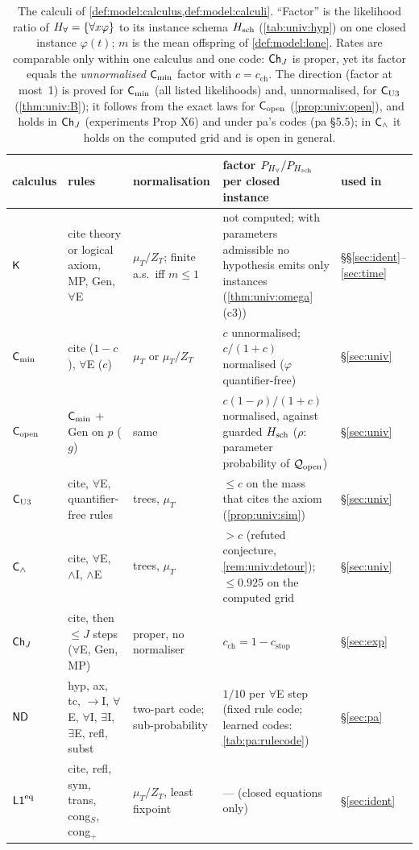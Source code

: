 \begin{table}[ht]
\crefabbrev
\centering\footnotesize
\begin{tabularx}{\textwidth}{@{}l>{\raggedright\arraybackslash}p{3.3cm}>{\raggedright\arraybackslash}p{2.4cm}>{\raggedright\arraybackslash}X>{\raggedright\arraybackslash}p{1.3cm}@{}}
\toprule
calculus & rules & normalisation & factor $P_{H_{\forall}}/P_{H_{\mathrm{sch}}}$ per closed instance & used in\\
\midrule
$\mathsf{K}$ & cite theory or logical axiom, MP, Gen, $\forall$E & $\mu_T/Z_T$; finite a.s.\ iff $m\le1$ & not computed; with parameters admissible no hypothesis emits only instances (\cref{thm:univ:omega}(c3)) & \S\S\ref{sec:ident}--\ref{sec:time}\\
$\mathsf{C}_{\min}$ & cite ($1-c$), $\forall$E ($c$) & $\mu_T$ or $\mu_T/Z_T$ & $c$ unnormalised; $c/(1+c)$ normalised ($\varphi$ quantifier-free) & \S\ref{sec:univ}\\
$\mathsf{C}_{\mathrm{open}}$ & $\mathsf{C}_{\min}$ + Gen on $p$ ($g$) & same & $c(1-\rho)/(1+c)$ normalised, against guarded $H_{\mathrm{sch}}$ ($\rho$: parameter probability of $\mathcal{Q}_{\mathrm{open}}$) & \S\ref{sec:univ}\\
$\mathsf{C}_{\mathrm{U3}}$ & cite, $\forall$E, quantifier-free rules & trees, $\mu_T$ & $\le c$ on the mass that cites the axiom (\cref{prop:univ:sim}) & \S\ref{sec:univ}\\
$\mathsf{C}_{\wedge}$ & cite, $\forall$E, $\wedge$I, $\wedge$E & trees, $\mu_T$ & $>c$ (refuted conjecture, \cref{rem:univ:detour}); $\le0.925$ on the computed grid & \S\ref{sec:univ}\\
$\mathsf{Ch}_{J}$ & cite, then $\le J$ steps ($\forall$E, Gen, MP) & proper, no normaliser & $c_{\mathrm{ch}}=1-c_{\mathrm{stop}}$ & \S\ref{sec:exp}\\
$\mathsf{ND}$ & hyp, ax, tc, $\to$I, $\forall$E, $\forall$I, $\exists$I, $\exists$E, refl, subst & two-part code; sub-probability & $1/10$ per $\forall$E step (fixed rule code; learned codes: \cref{tab:pa:rulecode}) & \S\ref{sec:pa}\\
$\mathord{\mathsf{L1}}^{\mathrm{eq}}$ & cite, refl, sym, trans, cong$_S$, cong$_+$ & $\mu_T/Z_T$, least fixpoint & --- (closed equations only) & \S\ref{sec:ident}\\
\bottomrule
\end{tabularx}
\caption{The calculi of \cref{def:model:calculus,def:model:calculi}. ``Factor'' is the likelihood ratio of $H_{\forall}=\{\forall x\varphi\}$ to its instance schema $H_{\mathrm{sch}}$ (\cref{tab:univ:hyp}) on one closed instance $\varphi(t)$; $m$ is the mean offspring of \cref{def:model:lone}. Rates are comparable only within one calculus and one code: $\mathsf{Ch}_{J}$ is proper, yet its factor equals the \emph{unnormalised} $\mathsf{C}_{\min}$ factor with $c=c_{\mathrm{ch}}$. The direction (factor at most~1) is proved for $\mathsf{C}_{\min}$ (all listed likelihoods) and, unnormalised, for $\mathsf{C}_{\mathrm{U3}}$ (\cref{thm:univ:B}); it follows from the exact laws for $\mathsf{C}_{\mathrm{open}}$ (\cref{prop:univ:open}), and holds in $\mathsf{Ch}_{J}$ (experiments Prop X6) and under pa's codes (pa \S5.5); in $\mathsf{C}_{\wedge}$ it holds on the computed grid and is open in general.}
\label{tab:model:calculi}
\end{table}

